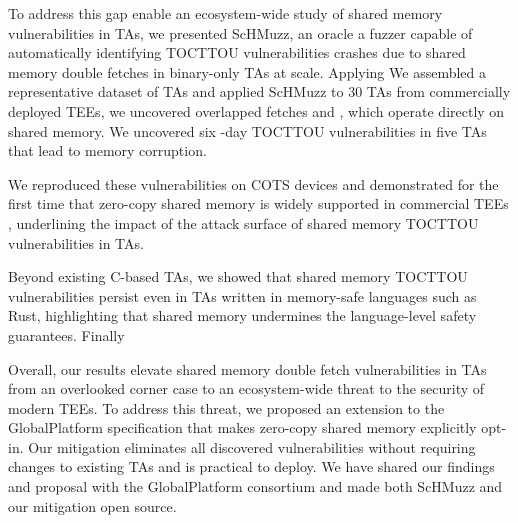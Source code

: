 \documentclass[conference]{IEEEtran} %
\newcommand{\sysname}{ScHMuzz\xspace}
\newcommand{\numTAsharnessed}{30\xspace}
\newcommand{\numTEEs}{five\xspace}
\newcommand{\numdfsmerge}{17,232\xspace}
\newcommand{\numvulns}{six\xspace}
\newcommand{\numvulnTAs}{five\xspace}
\providecommand{\DIFaddtex}[1]{{\protect\color{blue} \sf #1}} %
\providecommand{\DIFdeltex}[1]{{\protect\color{red} \scriptsize #1}} %
\providecommand{\DIFaddbegin}{} %
\providecommand{\DIFaddend}{} %
\providecommand{\DIFdelbegin}{} %
\providecommand{\DIFdelend}{} %
\providecommand{\DIFadd}[1]{\texorpdfstring{\DIFaddtex{#1}}{#1}} %
\providecommand{\DIFdel}[1]{\texorpdfstring{\DIFdeltex{#1}}{}} %
\begin{document}
To \DIFdelbegin \DIFdel{address this gap}\DIFdelend \DIFaddbegin \DIFadd{enable an ecosystem-wide study of shared memory vulnerabilities in TAs}\DIFaddend , we 
presented \sysname, \DIFdelbegin \DIFdel{an oracle }\DIFdelend \DIFaddbegin \DIFadd{a fuzzer }\DIFaddend capable of automatically 
identifying \DIFdelbegin \DIFdel{TOCTTOU vulnerabilities }\DIFdelend \DIFaddbegin \DIFadd{crashes due to shared memory double fetches }\DIFaddend in binary-only TAs at scale. 
\DIFdelbegin \DIFdel{Applying }\DIFdelend \DIFaddbegin \DIFadd{We assembled a representative dataset of TAs and applied }\DIFaddend \sysname to \numTAsharnessed{} TAs\DIFdelbegin \DIFdel{from }%
\DIFdel{commercially deployed TEEs, 
we uncovered }%
\DIFdel{overlapped fetches and }\DIFdelend \DIFaddbegin \DIFadd{, 
which operate directly on shared memory. 
We uncovered }\DIFaddend \numvulns{} \DIFaddbegin \DIFadd{0-day }\DIFaddend TOCTTOU vulnerabilities 
in \numvulnTAs{} TAs that lead to memory corruption. 
\DIFaddbegin 

\DIFaddend We reproduced these vulnerabilities 
on COTS devices and demonstrated \DIFaddbegin \DIFadd{for the first time }\DIFaddend that zero-copy shared memory is 
widely supported in commercial TEEs\DIFaddbegin \DIFadd{, underlining the impact of the attack surface of 
shared memory TOCTTOU vulnerabilities in TAs}\DIFaddend .  

Beyond existing C-based TAs, we showed that shared memory TOCTTOU vulnerabilities persist even in 
TAs written in memory-safe languages such as Rust, highlighting that shared memory undermines 
the language-level safety guarantees. 
\DIFdelbegin \DIFdel{Finally}\DIFdelend \DIFaddbegin 

\DIFadd{Overall, our results elevate shared memory double fetch vulnerabilities in TAs 
from an overlooked corner case to an ecosystem-wide threat to the security of modern TEEs.
To address this threat}\DIFaddend , we proposed an extension 
to the GlobalPlatform specification that makes zero-copy shared memory explicitly opt-in. 
Our mitigation eliminates all discovered vulnerabilities without requiring changes to existing 
TAs and is practical to deploy. We have shared our findings and proposal with the GlobalPlatform 
consortium and made both \sysname and our mitigation open source.
\end{document}
